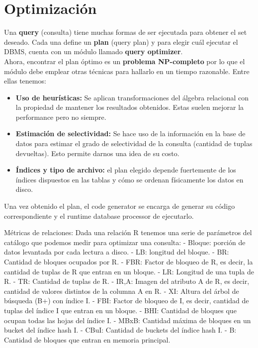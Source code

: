 \section*{Optimización}
Una \textbf{query} (consulta) tiene muchas formas de ser ejecutada para obtener el set deseado. Cada una define un \textbf{plan} (query plan) y para elegir cuál ejecutar el DBMS, cuenta con un módulo llamado \textbf{query optimizer}. \\
Ahora, encontrar el plan óptimo es un \textbf{problema NP-completo} por lo que el módulo debe emplear otras técnicas para hallarlo en un tiempo razonable. Entre ellas tenemos:
\begin{itemize}
    \item \textbf{Uso de heurísticas:} Se aplican transformaciones del álgebra relacional con la propiedad de mantener los resultados obtenidos. Estas suelen mejorar la performance pero no siempre.
    \item \textbf{Estimación de selectividad:} Se hace uso de la información en la base de datos para estimar el grado de selectividad de la consulta (cantidad de tuplas devueltas). Esto permite darnos una idea de su costo.
    \item \textbf{Índices y tipo de archivo:} el plan elegido depende fuertemente de los índices dispuestos en las tablas y cómo se ordenan físicamente los datos en disco.
\end{itemize}
Una vez obtenido el plan, el code generator se encarga de generar su código correspondiente y el runtime database processor de ejecutarlo.

Métricas de relaciones:
Dada una relación R tenemos una serie de parámetros del catálogo que podemos medir para optimizar una consulta:
- Bloque: porción de datos levantada por cada lectura a disco.
- LB: longitud del bloque.
- BR: Cantidad de bloques ocupados por R.
- FBR: Factor de bloqueo de R, es decir, la cantidad de tuplas de R que entran en un bloque.
- LR: Longitud de una tupla de R.
- TR: Cantidad de tuplas de R.
- IR,A: Imagen del atributo A de R, es decir, cantidad de valores distintos de la columna A en R.
- XI: Altura del árbol de búsqueda (B+) con índice I.
- FBI: Factor de bloqueo de I, es decir, cantidad de tuplas del índice I que entran en un bloque.
- BHI: Cantidad de bloques que ocupan todas las hojas del índice I.
- MBxB: Cantidad máxima de bloques en un bucket del índice hash I.
- CBuI: Cantidad de buckets del índice hash I.
- B: Cantidad de bloques que entran en memoria principal.


